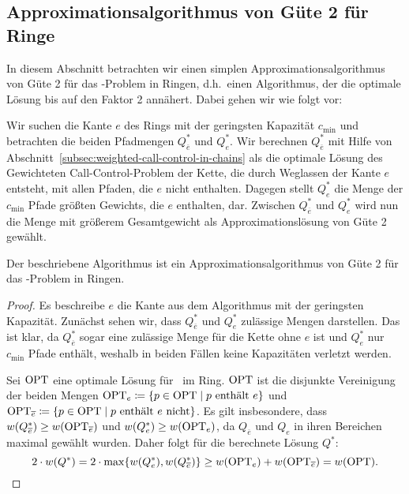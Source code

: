\subsection{Approximationsalgorithmus von Güte 2 für Ringe}
In diesem Abschnitt betrachten wir einen simplen Approximationsalgorithmus von Güte 2 für das \WeightedCallControl-Problem
in Ringen, d.h.\ einen Algorithmus, der die optimale Lösung bis auf den Faktor 2 annähert.
Dabei gehen wir wie folgt vor:

Wir suchen die Kante $e$ des Rings mit der geringsten Kapazität $c_{\min}$ und betrachten die beiden Pfadmengen
$Q_{\overline e}^*$ und $Q_{e}^*$.
Wir berechnen $Q_{\overline e}^*$ mit Hilfe von Abschnitt~\ref{subsec:weighted-call-control-in-chains} als die
optimale Lösung des Gewichteten Call-Control-Problem der Kette, die durch
Weglassen der Kante $e$ entsteht, mit allen Pfaden, die $e$ nicht enthalten.
Dagegen stellt $Q_e^*$ die Menge der $c_{\min}$ Pfade größten Gewichts, die $e$ enthalten, dar.
Zwischen $Q_{\overline e}^*$ und $Q_{e}^*$ wird nun die Menge mit größerem Gesamtgewicht als
Approximationslösung von Güte 2 gewählt.

\begin{theorem}
    Der beschriebene Algorithmus ist ein Approximationsalgorithmus von Güte 2 für das \WeightedCallControl-Problem in Ringen.
\end{theorem}
\begin{proof}
    Es beschreibe $e$ die Kante aus dem Algorithmus mit der geringsten Kapazität.
    Zunächst sehen wir, dass $Q_{\overline e}^*$ und $Q_e^*$ zulässige Mengen darstellen.
    Das ist klar, da $Q_{\overline e}^*$ sogar eine zulässige Menge für die Kette ohne $e$ ist und $Q_e^*$ nur $c_{\min}$
    Pfade enthält, weshalb in beiden Fällen keine Kapazitäten verletzt werden.

    Sei $\text{OPT}$ eine optimale Lösung für \WeightedCallControl\ im Ring.
    $\text{OPT}$ ist die disjunkte Vereinigung der beiden Mengen $\text{OPT}_e \coloneqq \{p \in \text{OPT} \mid p\ \text{enthält}\ e\}$ und
    $\OPT_{\overline e} \coloneqq \{p\in\OPT\mid p\ \text{enthält}\ e\ \text{nicht}\}$.
    Es gilt insbesondere, dass $w(Q_{\overline e}^*) \geq w(\text{OPT}_{\overline e})$ und
    $w(Q_e^*) \geq w(\text{OPT}_{e})$, da $Q_{\overline e}$ und $Q_e$ in ihren Bereichen maximal gewählt wurden.
    Daher folgt für die berechnete Lösung $Q^*$:
    \[2 \cdot w(Q^*) = 2 \cdot  \max\{w(Q_e^*), w(Q_{\overline e}^*)\} \geq
    w(\text{OPT}_e) + w(\text{OPT}_{\overline e}) = w(\text{OPT}) .\]
\end{proof}
